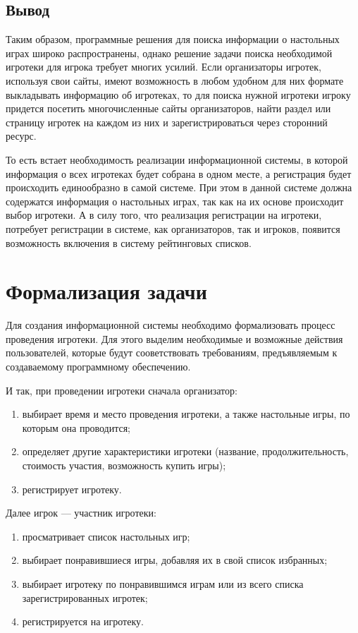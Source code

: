 \subsection*{Вывод}

Таким образом, программные решения для поиска информации о настольных играх
широко распространены, однако решение задачи поиска необходимой игротеки для
игрока требует многих усилий. Если организаторы игротек, используя свои сайты,
имеют возможность в любом удобном для них формате выкладывать информацию об
игротеках, то для поиска нужной игротеки игроку придется посетить многочисленные
сайты организаторов, найти раздел или страницу игротек на каждом из них и
зарегистрироваться через сторонний ресурс.

То есть встает необходимость реализации информационной системы, в которой
информация о всех игротеках будет собрана в одном месте, а регистрация будет
происходить единообразно в самой системе. При этом в данной системе должна
содержатся информация о настольных играх, так как на их основе происходит выбор
игротеки. А в силу того, что реализация регистрации на игротеки, потребует
регистрации в системе, как организаторов, так и игроков, появится возможность
включения в систему рейтинговых списков.

\section{Формализация задачи}

Для создания информационной системы необходимо формализовать процесс проведения
игротеки. Для этого выделим необходимые и возможные действия пользователей,
которые будут сооветствовать требованиям, предъявляемым к
создаваемому программному обеспечению.

И так, при проведении игротеки сначала организатор:
\begin{enumerate}[label=\arabic*)]
    \item выбирает время и место проведения игротеки, а также настольные игры,
      по которым она проводится;
    \item определяет другие характеристики игротеки (название,
        продолжительность, стоимость участия, возможность купить игры);
    \item регистрирует игротеку.
\end{enumerate}

Далее игрок --- участник игротеки:
\begin{enumerate}[label=\arabic*)]
    \item просматривает список настольных игр;
    \item выбирает понравившиеся игры, добавляя их в свой список избранных;
    \item выбирает игротеку по понравившимся играм или из всего списка
        зарегистрированных игротек;
    \item регистрируется на игротеку.
\end{enumerate}

